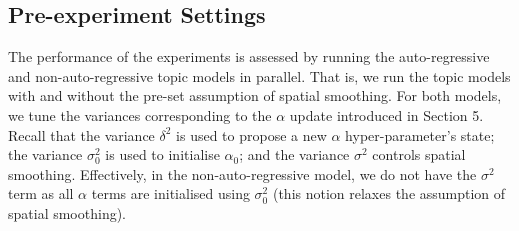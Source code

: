 \documentclass{mpaper}
\begin{document}
\subsection{Pre-experiment Settings}

\par The performance of the experiments is assessed by running the auto-regressive and non-auto-regressive topic models in parallel. That is, we run the topic models with and without the pre-set assumption of spatial smoothing. For both models, we tune the variances corresponding to the $\alpha$ update introduced in Section 5. Recall that the variance $\delta^2$ is used to propose a new $\alpha$ hyper-parameter's state; the variance $\sigma_0^2$ is used to initialise $\alpha_0$; and the variance $\sigma^2$ controls spatial smoothing. Effectively, in the non-auto-regressive model, we do not have the $\sigma^2$ term as all $\alpha$ terms are initialised using $\sigma_0^2$ (this notion relaxes the assumption of spatial smoothing).
\end{document}
